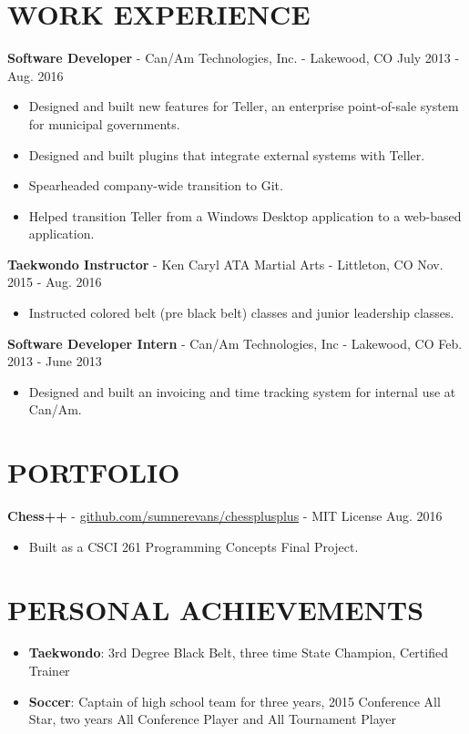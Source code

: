 \documentclass[10.5pt,letterpaper]{article}
\begin{document}
\section*{WORK EXPERIENCE}
\textbf{Software Developer} - Can/Am Technologies, Inc. - Lakewood, CO
\hfill July 2013 - Aug. 2016
\begin{itemize}
    \item Designed and built new features for Teller, an enterprise
        point-of-sale system for municipal governments.
    \item Designed and built plugins that integrate external systems with
        Teller.
    \item Spearheaded company-wide transition to Git.
    \item Helped transition Teller from a Windows Desktop application to a
        web-based application.
\end{itemize}

\vspace{4pt}
\textbf{Taekwondo Instructor} - Ken Caryl ATA Martial Arts - Littleton, CO
\hfill Nov. 2015 - Aug. 2016
\begin{itemize}
    \item Instructed colored belt (pre black belt) classes and junior leadership
        classes.
\end{itemize}

\vspace{4pt}
\textbf{Software Developer Intern} - Can/Am Technologies, Inc - Lakewood, CO
\hfill Feb. 2013 - June 2013
\begin{itemize}
    \item Designed and built an invoicing and time tracking system for internal
        use at Can/Am.
\end{itemize}

\section*{PORTFOLIO}
\textbf{Chess++} -
\href{https://github.com/sumnerevans/chessplusplus}{github.com/sumnerevans/chessplusplus}
- MIT License \hfill Aug. 2016
\begin{itemize}
    \item Built as a CSCI 261 Programming Concepts Final Project.
\end{itemize}

\section*{PERSONAL ACHIEVEMENTS}
\begin{itemize}
    \item \textbf{Taekwondo}: 3rd Degree Black Belt, three time State Champion,
        Certified Trainer
    \item \textbf{Soccer}: Captain of high school team for three years, 2015
        Conference All Star, two years All Conference Player and All Tournament
        Player
\end{itemize}
\end{document}
